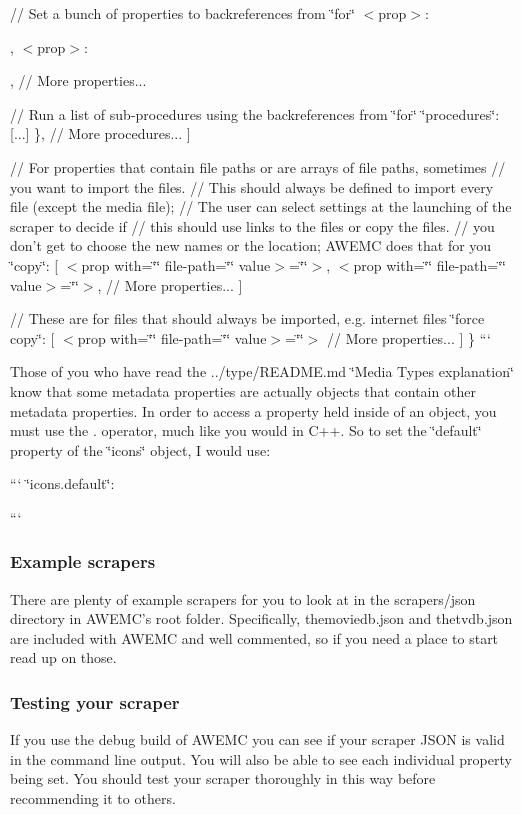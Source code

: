 // Set a bunch of properties to backreferences from \char`\"{}for\char`\"{} $<$prop$>$\-: 

, $<$prop$>$\-: 

, // More properties...

// Run a list of sub-\/procedures using the backreferences from \char`\"{}for\char`\"{} \char`\"{}procedures\char`\"{}\-: \mbox{[}...\mbox{]} \}, // More procedures... \mbox{]}

// For properties that contain file paths or are arrays of file paths, sometimes // you want to import the files. // This should always be defined to import every file (except the media file); // The user can select settings at the launching of the scraper to decide if // this should use links to the files or copy the files. // you don't get to choose the new names or the location; A\-W\-E\-M\-C does that for you \char`\"{}copy\char`\"{}\-: \mbox{[} $<$prop with=\char`\"{}\char`\"{} file-\/path=\char`\"{}\char`\"{} value$>$=\char`\"{}\char`\"{}$>$, $<$prop with=\char`\"{}\char`\"{} file-\/path=\char`\"{}\char`\"{} value$>$=\char`\"{}\char`\"{}$>$, // More properties... \mbox{]}

// These are for files that should always be imported, e.\-g. internet files \char`\"{}force copy\char`\"{}\-: \mbox{[} $<$prop with=\char`\"{}\char`\"{} file-\/path=\char`\"{}\char`\"{} value$>$=\char`\"{}\char`\"{}$>$ // More properties... \mbox{]} \} ```

Those of you who have read the ../type/\-R\-E\-A\-D\-M\-E.md \char`\"{}\-Media Types explanation\char`\"{} know that some metadata properties are actually objects that contain other metadata properties. In order to access a property held inside of an object, you must use the {\ttfamily .} operator, much like you would in C++. So to set the \char`\"{}default\char`\"{} property of the \char`\"{}icons\char`\"{} object, I would use\-:

``` \char`\"{}icons.\-default\char`\"{}\-: 

```

\subsubsection*{Example scrapers}

There are plenty of example scrapers for you to look at in the {\ttfamily scrapers/json} directory in A\-W\-E\-M\-C's root folder. Specifically, {\ttfamily themoviedb.\-json} and {\ttfamily thetvdb.\-json} are included with A\-W\-E\-M\-C and well commented, so if you need a place to start read up on those.

\subsubsection*{Testing your scraper}

If you use the debug build of A\-W\-E\-M\-C you can see if your scraper J\-S\-O\-N is valid in the command line output. You will also be able to see each individual property being set. You should test your scraper thoroughly in this way before recommending it to others. 